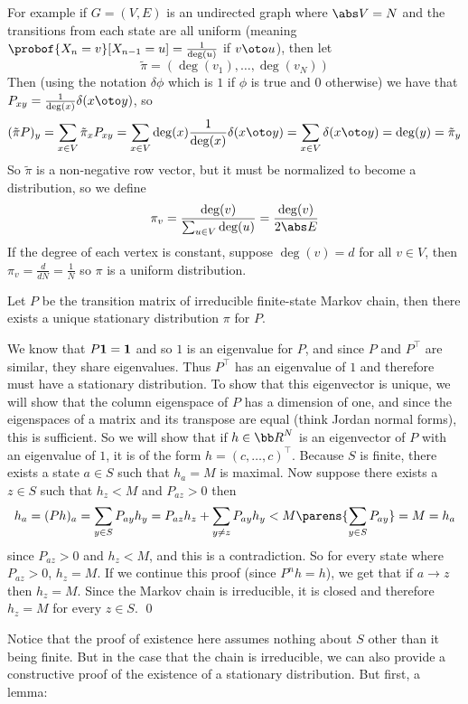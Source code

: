 For example if $G=(V,E)$ is an undirected graph where $\abs V=N$ and the transitions from each state are all uniform (meaning $\probof{X_n=v}[X_{n-1}=u]=\frac1{\deg(u)}$ if $v\oto u$), then let
$$ \tilde\pi = (\deg(v_1),\dots,\deg(v_N)) $$
Then (using the notation $\delta\phi$ which is $1$ if $\phi$ is true and $0$ otherwise) we have that $P_{xy}=\frac1{\deg(x)}\delta(x\oto y)$, so
$$ (\tilde\pi P)_y = \sum_{x\in V}\tilde\pi_x P_{xy} = \sum_{x\in V}\deg(x)\frac1{\deg(x)}\delta(x\oto y) = \sum_{x\in V}\delta(x\oto y) = \deg(y) = \tilde\pi_y $$
So $\tilde\pi$ is a non-negative row vector, but it must be normalized to become a distribution, so we define
$$ \pi_v = \frac{\deg(v)}{\sum_{u\in V}\deg(u)} = \frac{\deg(v)}{2\abs E} $$
If the degree of each vertex is constant, suppose $\deg(v)=d$ for all $v\in V$, then $\pi_v=\frac{d}{dN}=\frac1N$ so $\pi$ is a uniform distribution.

\bthrm[title=Existence and Uniqueness Theorem, name=eautheorem]

    Let $P$ be the transition matrix of irreducible finite-state Markov chain, then there exists a unique stationary distribution $\pi$ for $P$.

\ethrm

We know that $P{\bf1}={\bf1}$ and so $1$ is an eigenvalue for $P$, and since $P$ and $P^\top$ are similar, they share eigenvalues.
Thus $P^\top$ has an eigenvalue of $1$ and therefore must have a stationary distribution.
To show that this eigenvector is unique, we will show that the column eigenspace of $P$ has a dimension of one, and since the eigenspaces of a matrix and its transpose are equal (think Jordan normal forms),
this is sufficient.
So we will show that if $h\in{\bb R}^N$ is an eigenvector of $P$ with an eigenvalue of $1$, it is of the form $h=(c,\dots,c)^\top$.
Because $S$ is finite, there exists a state $a\in S$ such that $h_a=M$ is maximal.
Now suppose there exists a $z\in S$ such that $h_z<M$ and $P_{az}>0$ then
$$ h_a = (Ph)_a = \sum_{y\in S}P_{ay}h_y = P_{az}h_z + \sum_{y\neq z}P_{ay}h_y < M\parens{\sum_{y\in S}P_{ay}} = M = h_a $$
since $P_{az}>0$ and $h_z<M$, and this is a contradiction.
So for every state where $P_{az}>0$, $h_z=M$.
If we continue this proof (since $P^nh=h$), we get that if $a\to z$ then $h_z=M$.
Since the Markov chain is irreducible, it is closed and therefore $h_z=M$ for every $z\in S$.
\qed

Notice that the proof of existence here assumes nothing about $S$ other than it being finite.
But in the case that the chain is irreducible, we can also provide a constructive proof of the existence of a stationary distribution.
But first, a lemma:

